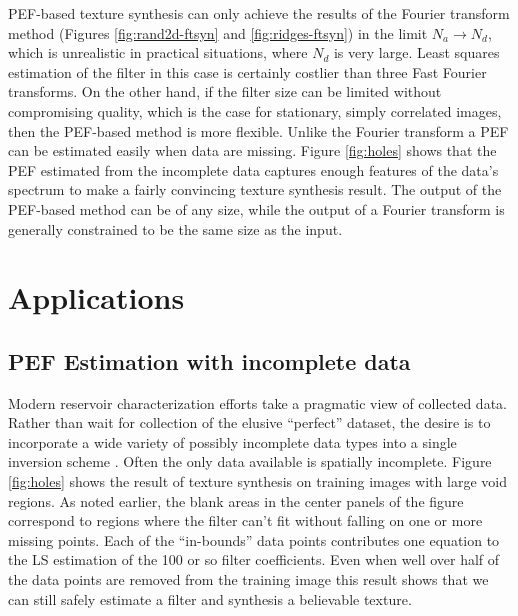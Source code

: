 	PEF-based texture synthesis can only achieve the results of the Fourier transform
	method (Figures \ref{fig:rand2d-ftsyn} and \ref{fig:ridges-ftsyn}) in the limit 
	$N_a \rightarrow N_d$, which is unrealistic in practical situations, where $N_d$ is 
	very large.
	Least squares estimation of the filter in this case is certainly costlier than three 
	Fast Fourier transforms.  On the other hand, if the filter size can be limited
	without compromising quality, which is the case for stationary, simply correlated 
	images, then
	the PEF-based method is more flexible.  Unlike the Fourier transform 
	a PEF can be estimated easily when data are missing.  Figure \ref{fig:holes}
	shows that the PEF estimated from the incomplete data captures enough features
	of the data's spectrum to make a fairly convincing texture synthesis result.
	The output of the PEF-based method can be of any size, while the output of a
	Fourier transform	is generally constrained to be the same size as the input.

\section{ Applications}

	\subsection{ PEF Estimation with incomplete data }

	Modern reservoir characterization efforts take a pragmatic view of collected data.
	Rather than wait for collection of the elusive ``perfect'' dataset, the desire 
	is to incorporate a wide variety of possibly incomplete data types into a single 
	inversion scheme {\small \cite[]{caers-journel}}.   
	Often the only data available is spatially incomplete.
	Figure \ref{fig:holes} shows the result of texture synthesis on training images with 
	large void regions.
	As noted earlier, the blank areas in the center panels of the figure correspond to 
	regions where the filter can't fit without falling on one or more missing points.
	Each of the ``in-bounds'' data points contributes one equation to the LS estimation 
	of the 100 or so filter coefficients.  Even when well over half of the data points
	are removed from the training image this result shows that we can still safely 
	estimate a filter and synthesis a believable texture.  



